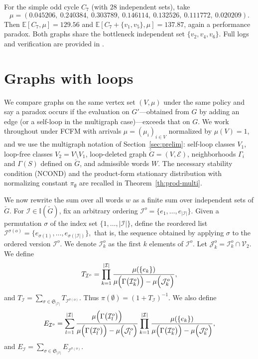 \documentclass[11pt]{article}
\begin{document}
For the simple odd cycle $C_7$ (with $28$ independent sets), take
\[
\mu=(0.045206,\ 0.240384,\ 0.303789,\ 0.146114,\ 0.132526,\ 0.111772,\ 0.020209).
\]
Then $\mathbb{E}[C_7,\mu]=129.56$ and $\mathbb{E}[C_7+\{v_1,v_5\},\mu]=137.87$, again a performance paradox.
Both graphs share the bottleneck independent set $\{v_2,v_4,v_6\}$.
Full logs and verification are provided in \cite{li2025b}.

\section{Graphs with loops}\label{sec:with-loops}

We compare graphs on the same vertex set $(V,\mu)$ under the same policy and say a paradox occurs if the evaluation on $G'$—obtained from $G$ by adding an edge (or a self-loop in the multigraph case)—exceeds that on $G$.
We work throughout under \textsc{FCFM} with arrivals $\mu=(\mu_i)_{i\in V}$ normalized by $\mu(V)=1$, and we use the multigraph notation of Section~\ref{sec:prelim}: self-loop classes $V_1$, loop-free classes $V_2=V\setminus V_1$, loop-deleted graph $\check{G}=(V,\mathcal{E})$, neighborhoods $\Gamma_i$ and $\Gamma(S)$ defined on $\check{G}$, and admissible words $W$. The necessary stability condition (\textsc{NCOND}) and the product-form stationary distribution with normalizing constant $\pi_{\emptyset}$ are recalled in Theorem~\ref{th:prod-multi}.

We now rewrite the sum over all words $w$ as a finite sum over independent sets of $\check{G}$. 
For $\mathcal{I}\in\mathbb{I}(\check G)$,  fix an arbitrary ordering 
$\mathcal{I}^o=\{e_1,\dots,e_{|\mathcal{I}|}\}$. Given a permutation $\sigma$ 
of the index set $\{1,\dots,|\mathcal{I}|\}$, define the reordered 
list $\mathcal{I}^{\sigma(o)}=\{e_{\sigma(1)},\dots,e_{\sigma(|\mathcal{I}|)}\},$
that is, the sequence obtained by applying 
$\sigma$ to the ordered version $\mathcal{I}^o$. 
We denote $\mathcal{I}_k^o$ as the first $k$ elements of $\mathcal{I}^o$.
Let $\mathcal{J}_k^o=\mathcal{I}_k^o\cap \mathcal{V}_2$. 
We define 
\begin{equation}
	T_{\mathcal{I}^o}=\prod_{k=1}^{|\mathcal{I}|}\frac{\mu(\{e_{k}\})}{\mu\Bigl(\Gamma\bigl(\mathcal{I}_k^o\bigr)\Bigr)-\mu\Bigl(\mathcal{J}_k^o\Bigr)},
\end{equation}
and $T_{\mathcal{I}}=\sum_{\sigma \in \mathfrak{S}_{|\mathcal{I}|}} T_{\mathcal{I}^{\sigma(o)}}$. Thus $\pi(\emptyset) = (1 +T_{\mathcal{I}})^{-1}$. 
We also define
\begin{equation}
	E_{\mathcal{I}^o}=\sum_{l=1}^{|\mathcal{I}|}
	\frac{\mu\Bigl(\Gamma\bigl(\mathcal{I}_l^o\bigr)\Bigr)}
	{\mu\Bigl(\Gamma\bigl(\mathcal{I}_l^o\bigr)\Bigr)-
\mu\Bigl(\mathcal{J}_l^o\Bigr)}\prod_{k=1}^{|\mathcal{I}|}
	\frac{\mu(\{e_{k}\})}{\mu\Bigl(\Gamma\bigl(\mathcal{I}_k^o\bigr)\Bigr)-
\mu\Bigl(\mathcal{J}_k^o\Bigr)},   
\end{equation}
and $E_{\mathcal{I}}=\sum_{\sigma \in \mathfrak{S}_{|\mathcal{I}|}} E_{\mathcal{I}^{\sigma(o)}}$.
\end{document}
